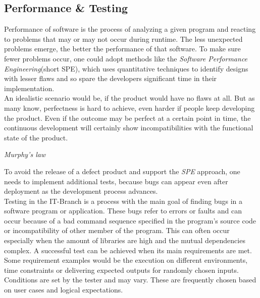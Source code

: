 \subsection{Performance \& Testing}
Performance of software is the process of analyzing a given program and reacting to problems that may or may not occur during runtime. The less unexpected problems emerge, the better the performance of that software\cite{8432081}. 
To make sure fewer problems occur, one could adopt methods like the \textit{Software Performance Engineering}(short SPE), which uses quantitative techniques to identify designs with lesser flaws and so spare the developers significant time in their implementation\cite{4299916}.\\
An idealistic scenario would be, if the product would have no flaws at all. But as many know, perfectness is hard to achieve, even harder if people keep developing the product. Even if the outcome may be perfect at a certain point in time, the continuous development will certainly show incompatibilities with the functional state of the product.
\begin{center}
	\begin{flushright}
		\textit{Murphy's law}
	\end{flushright}
\end{center}
To avoid the release of a defect product and support the \textit{SPE} approach, one needs to implement additional tests, because bugs can appear even after deployment as the development process advances.\\
Testing in the IT-Branch is a process with the main goal of finding bugs in a software program or application. These bugs refer to errors or faults and can occur because of a bad command sequence specified in the program's source code or incompatibility of other member of the program. This can often occur especially when the \dq amount of libraries are high and the mutual dependencies complex\dq{}\cite{7302456}. A successful test can be achieved when its main requirements are met. Some requirement examples would be the execution on different environments, time constraints or delivering expected outputs for randomly chosen inputs. Conditions are set by the tester and may vary. These are frequently chosen based on user cases and logical expectations.
